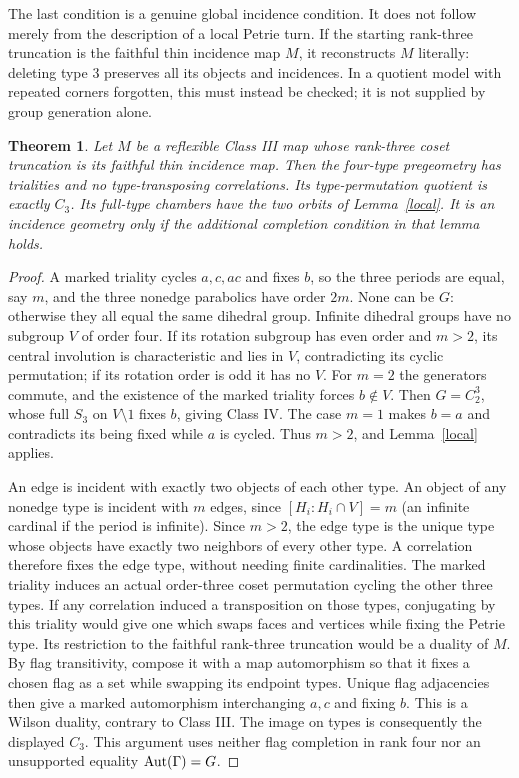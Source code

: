 \documentclass[11pt,a4paper]{article}
\newtheorem{theorem}{Theorem}\newtheorem{lemma}[theorem]{Lemma}\newtheorem{proposition}[theorem]{Proposition}
\begin{document}
The last condition is a genuine global incidence condition. It does
not follow merely from the description of a local Petrie turn.
If the starting rank-three truncation is the faithful thin incidence
map $M$, it reconstructs $M$ literally: deleting type 3 preserves
all its objects and incidences. In a quotient model with repeated
corners forgotten, this must instead be checked; it is not supplied
by group generation alone.

\begin{theorem}\label{classIII}
Let $M$ be a reflexible Class III map whose rank-three coset
truncation is its faithful thin incidence map. Then the four-type
pregeometry has trialities and no type-transposing correlations.
Its type-permutation quotient is exactly $C_3$. Its full-type chambers
have the two orbits of Lemma~\ref{local}. It is an incidence geometry
only if the additional completion condition in that lemma holds.
\end{theorem}
\begin{proof}
A marked triality cycles $a,c,ac$ and fixes $b$, so the three
periods are equal, say $m$, and the three nonedge parabolics have
order $2m$. None can be $G$: otherwise they all equal the same
dihedral group. Infinite dihedral groups have no subgroup $V$ of
order four. If its rotation subgroup has even order and $m>2$,
its central involution is characteristic and lies in $V$, contradicting
its cyclic permutation; if its rotation order is odd it has no $V$.
For $m=2$ the generators commute, and the existence of the marked
triality forces $b\notin V$. Then $G=C_2^3$, whose full $S_3$ on
$V\setminus1$ fixes $b$, giving Class IV. The case $m=1$ makes
$b=a$ and contradicts its being fixed while $a$ is cycled.
Thus $m>2$, and Lemma~\ref{local} applies.

An edge is incident with exactly two objects of each other type.
An object of any nonedge type is incident with $m$ edges, since
$[H_i:H_i\cap V]=m$ (an infinite cardinal if the period is infinite).
Since $m>2$, the edge type is the unique type whose objects have
exactly two neighbors of every other type. A correlation therefore
fixes the edge type, without needing finite cardinalities. The marked
triality induces an actual order-three coset permutation cycling the
other three types. If any correlation induced a transposition on
those types, conjugating by this triality would give one which swaps
faces and vertices while fixing the Petrie type. Its restriction to
the faithful rank-three truncation would be a duality of $M$.
By flag transitivity, compose it with a map automorphism so that it
fixes a chosen flag as a set while swapping its endpoint types.
Unique flag adjacencies then give a marked automorphism interchanging
$a,c$ and fixing $b$. This is a Wilson duality, contrary to Class III.
The image on types is consequently the displayed $C_3$. This argument
uses neither flag completion in rank four nor an unsupported equality
$\operatorname{Aut}(\Gamma)=G$.
\end{proof}
\end{document}
